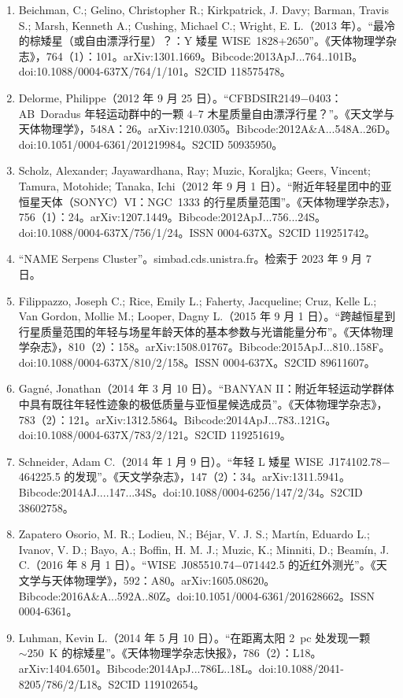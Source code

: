 \begin{enumerate}
\item Beichman, C.; Gelino, Christopher R.; Kirkpatrick, J. Davy; Barman, Travis S.; Marsh, Kenneth A.; Cushing, Michael C.; Wright, E. L.（2013 年）。“最冷的棕矮星（或自由漂浮行星）？：Y 矮星 WISE~1828+2650”。《天体物理学杂志》，764（1）：101。arXiv:1301.1669。Bibcode:2013ApJ...764..101B。doi:10.1088/0004-637X/764/1/101。S2CID 118575478。  
\item Delorme, Philippe（2012 年 9 月 25 日）。“CFBDSIR2149$-$0403：AB~Doradus 年轻运动群中的一颗 $4$--$7$ 木星质量自由漂浮行星？”。《天文学与天体物理学》，548A：26。arXiv:1210.0305。Bibcode:2012A\&A...548A..26D。doi:10.1051/0004-6361/201219984。S2CID 50935950。  
\item Scholz, Alexander; Jayawardhana, Ray; Muzic, Koraljka; Geers, Vincent; Tamura, Motohide; Tanaka, Ichi（2012 年 9 月 1 日）。“附近年轻星团中的亚恒星天体（SONYC）VI：NGC~1333 的行星质量范围”。《天体物理学杂志》，756（1）：24。arXiv:1207.1449。Bibcode:2012ApJ...756...24S。doi:10.1088/0004-637X/756/1/24。ISSN 0004-637X。S2CID 119251742。  
\item “NAME Serpens Cluster”。simbad.cds.unistra.fr。检索于 2023 年 9 月 7 日。
\item Filippazzo, Joseph C.; Rice, Emily L.; Faherty, Jacqueline; Cruz, Kelle L.; Van Gordon, Mollie M.; Looper, Dagny L.（2015 年 9 月 1 日）。“跨越恒星到行星质量范围的年轻与场星年龄天体的基本参数与光谱能量分布”。《天体物理学杂志》，810（2）：158。arXiv:1508.01767。Bibcode:2015ApJ...810..158F。doi:10.1088/0004-637X/810/2/158。ISSN 0004-637X。S2CID 89611607。  
\item Gagné, Jonathan（2014 年 3 月 10 日）。“BANYAN II：附近年轻运动学群体中具有既往年轻性迹象的极低质量与亚恒星候选成员”。《天体物理学杂志》，783（2）：121。arXiv:1312.5864。Bibcode:2014ApJ...783..121G。doi:10.1088/0004-637X/783/2/121。S2CID 119251619。  
\item Schneider, Adam C.（2014 年 1 月 9 日）。“年轻 L 矮星 WISE~J174102.78$-$464225.5 的发现”。《天文学杂志》，147（2）：34。arXiv:1311.5941。Bibcode:2014AJ....147...34S。doi:10.1088/0004-6256/147/2/34。S2CID 38602758。  
\item Zapatero Osorio, M. R.; Lodieu, N.; Béjar, V. J. S.; Martín, Eduardo L.; Ivanov, V. D.; Bayo, A.; Boffin, H. M. J.; Muzic, K.; Minniti, D.; Beamín, J. C.（2016 年 8 月 1 日）。“WISE~J085510.74$-$071442.5 的近红外测光”。《天文学与天体物理学》，592：A80。arXiv:1605.08620。Bibcode:2016A\&A...592A..80Z。doi:10.1051/0004-6361/201628662。ISSN 0004-6361。  
\item Luhman, Kevin L.（2014 年 5 月 10 日）。“在距离太阳 2~pc 处发现一颗 $\sim250$~K 的棕矮星”。《天体物理学杂志快报》，786（2）：L18。arXiv:1404.6501。Bibcode:2014ApJ...786L..18L。doi:10.1088/2041-8205/786/2/L18。S2CID 119102654。  

\end{enumerate}
